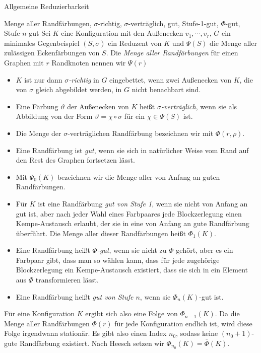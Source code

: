 \begin{section}{Allgemeine Reduzierbarkeit}
 \begin{definition}{Menge aller Randfärbungen, $\sigma$-richtig, $\sigma$-verträglich, gut, Stufe-1-gut, $\Phi$-gut, Stufe-$n$-gut}
  Sei $K$ eine Konfiguration mit den Außenecken $v_1,\cdots,v_r$, $G$ ein minimales Gegenbeispiel $(S,\sigma)$ ein Reduzent von $K$ und $\Psi(S)$ die Menge aller zulässigen Eckenfärbungen von $S$. Die \textit{Menge aller Randfärbungen} für einen Graphen mit $r$ Randknoten nennen wir $\Psi(r)$
  \begin{itemize}
   \item $K$ ist nur dann \textit{$\sigma$-richtig} in $G$ eingebettet, wenn zwei Außenecken von $K$, die von $\sigma$ gleich abgebildet werden, in $G$ nicht benachbart sind. 
   \item Eine Färbung $\vartheta$ der Außenecken von $K$ heißt \textit{$\sigma$-verträglich}, wenn sie als Abbildung von der Form $\vartheta = \chi \circ \sigma$ für ein $\chi \in \Psi(S)$ ist.
   \item Die Menge der $\sigma$-verträglichen Randfärbung bezeichnen wir mit $\Phi(r,\rho)$.
   \item Eine Randfärbung ist \textit{gut}, wenn sie sich in natürlicher Weise vom Rand auf den Rest des Graphen fortsetzen lässt.
   \item Mit $\Psi_0(K)$ bezeichnen wir die Menge aller von Anfang an guten Randfärbungen.
   \item Für $K$ ist eine Randfärbung \textit{gut von Stufe 1}, wenn sie nicht von Anfang an gut ist, aber nach jeder Wahl eines Farbpaares jede Blockzerlegung einen Kempe-Austausch erlaubt, der sie in eine von Anfang an gute Randfärbung überführt. Die Menge aller dieser Randfärbungen heißt $\Phi_1(K)$.
   \item Eine Randfärbung heißt \textit{$\Phi$-gut}, wenn sie nicht zu $\Phi$ gehört, aber es ein Farbpaar gibt, dass man so wählen kann, dass für jede zugehörige Blockzerlegung ein Kempe-Austausch existiert, dass sie sich in ein Element aus $\Phi$ transformieren lässt.
   \item Eine Randfärbung heißt \textit{gut von Stufe $n$}, wenn sie $\Phi_n(K)$-gut ist.
  \end{itemize}
  Für eine Konfiguration $K$ ergibt sich also eine Folge von $\Phi_{n-1}(K)$. Da die Menge aller Randfärbungen $\Phi(r)$ für jede Konfiguration endlich ist, wird diese Folge irgendwann stationär. Es gibt also einen Index $n_0$, sodass keine $(n_0+1)$-gute Randfärbung existiert. Nach Heesch setzen wir $\Phi_{n_0}(K) = \overline{\Phi}(K)$.
 \end{definition}


\end{section}
